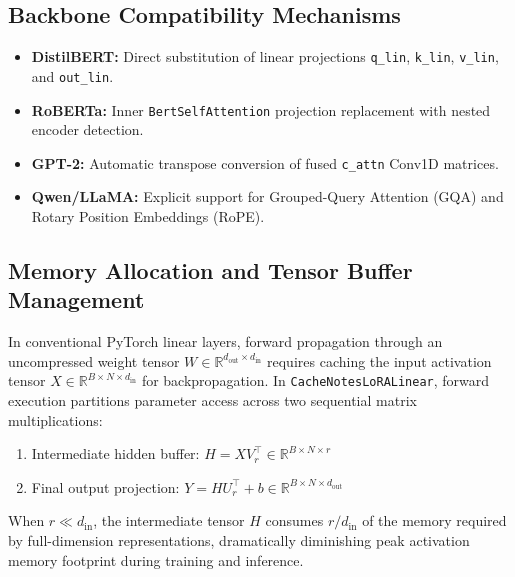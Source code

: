 \subsection{Backbone Compatibility Mechanisms}
\begin{itemize}
\item \textbf{DistilBERT:} Direct substitution of linear projections \texttt{q\_lin}, \texttt{k\_lin}, \texttt{v\_lin}, and \texttt{out\_lin}.
\item \textbf{RoBERTa:} Inner \texttt{BertSelfAttention} projection replacement with nested encoder detection.
\item \textbf{GPT-2:} Automatic transpose conversion of fused \texttt{c\_attn} Conv1D matrices.
\item \textbf{Qwen/LLaMA:} Explicit support for Grouped-Query Attention (GQA) and Rotary Position Embeddings (RoPE).
\end{itemize}

\subsection{Memory Allocation and Tensor Buffer Management}
In conventional PyTorch linear layers, forward propagation through an uncompressed weight tensor $W \in \mathbb{R}^{d_{\text{out}} \times d_{\text{in}}}$ requires caching the input activation tensor $X \in \mathbb{R}^{B \times N \times d_{\text{in}}}$ for backpropagation. In \texttt{CacheNotesLoRALinear}, forward execution partitions parameter access across two sequential matrix multiplications:
\begin{enumerate}
\item Intermediate hidden buffer: $H = X V_r^\top \in \mathbb{R}^{B \times N \times r}$
\item Final output projection: $Y = H U_r^\top + b \in \mathbb{R}^{B \times N \times d_{\text{out}}}$
\end{enumerate}
When $r \ll d_{\text{in}}$, the intermediate tensor $H$ consumes $r / d_{\text{in}}$ of the memory required by full-dimension representations, dramatically diminishing peak activation memory footprint during training and inference.

